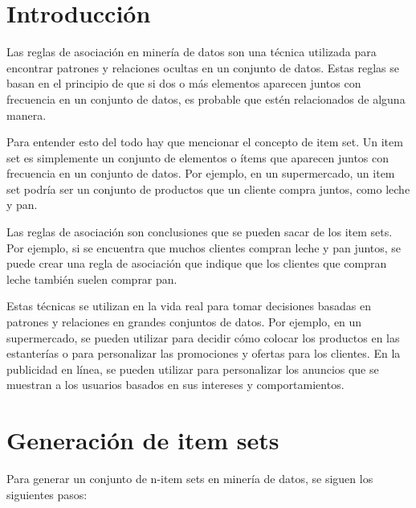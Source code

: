 
\section{Introducción}

Las reglas de asociación en minería de datos son una técnica utilizada para encontrar patrones y relaciones ocultas en un conjunto de datos. Estas reglas se basan en el principio de que si dos o más elementos aparecen juntos con frecuencia en un conjunto de datos, es probable que estén relacionados de alguna manera. \cite{wiki:reglasasociacion}

Para entender esto del todo hay que mencionar el concepto de item set. Un item set es simplemente un conjunto de elementos o ítems que aparecen juntos con frecuencia en un conjunto de datos. Por ejemplo, en un supermercado, un item set podría ser un conjunto de productos que un cliente compra juntos, como leche y pan. \cite{itemsets}

Las reglas de asociación son conclusiones que se pueden sacar de los item sets. Por ejemplo, si se encuentra que muchos clientes compran leche y pan juntos, se puede crear una regla de asociación que indique que los clientes que compran leche también suelen comprar pan.

Estas técnicas se utilizan en la vida real para tomar decisiones basadas en patrones y relaciones en grandes conjuntos de datos. Por ejemplo, en un supermercado, se pueden utilizar para decidir cómo colocar los productos en las estanterías o para personalizar las promociones y ofertas para los clientes. En la publicidad en línea, se pueden utilizar para personalizar los anuncios que se muestran a los usuarios basados en sus intereses y comportamientos.

\section{Generación de item sets}

Para generar un conjunto de n-item sets en minería de datos, se siguen los siguientes pasos: \cite{pdf_reglas}

